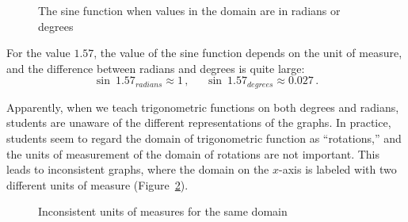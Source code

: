 \begin{figure}[htb]
\begin{center}
\caption{The sine function when values in the domain are in radians or degrees}\label{fig.degrees-or-radians}
\end{center}
\end{figure}

\newpage

For the value $1.57$, the value of the sine function depends on the unit of measure, and the difference between radians and degrees is quite large:
\[
\sin\: 1.57_{\scriptstyle radians} \approx 1\,,\;\;\;\;\; \sin \: 1.57_{\scriptstyle degrees}\approx 0.027\,.
\]

Apparently, when we teach trigonometric functions on both degrees and radians, students are unaware of the different representations of the graphs. In practice, students seem to regard the domain of trigonometric function as ``rotations,'' and the units of measurement of the domain of rotations are not important. This leads to inconsistent graphs, where the domain on the $x$-axis is labeled with two different units of measure (Figure~\ref{fig.both-radians-and-degrees}).
 
\begin{figure}[hbt]
\begin{center}
\caption{Inconsistent units of measures for the same domain}\label{fig.both-radians-and-degrees}
\end{center}
\end{figure}

